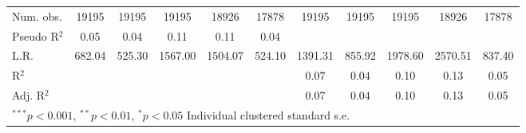 \begin{table}
\begin{center}
\begin{tabular}{l c c c c c c c c c c }
\hline
Num. obs.          & 19195         & 19195        & 19195         & 18926         & 17878        & 19195         & 19195        & 19195         & 18926         & 17878        \\
Pseudo R$^2$       & 0.05          & 0.04         & 0.11          & 0.11          & 0.04         &               &              &               &               &              \\
L.R.               & 682.04        & 525.30       & 1567.00       & 1504.07       & 524.10       & 1391.31       & 855.92       & 1978.60       & 2570.51       & 837.40       \\
R$^2$              &               &              &               &               &              & 0.07          & 0.04         & 0.10          & 0.13          & 0.05         \\
Adj. R$^2$         &               &              &               &               &              & 0.07          & 0.04         & 0.10          & 0.13          & 0.05         \\
\hline
\multicolumn{11}{l}{\scriptsize{$^{***}p<0.001$, $^{**}p<0.01$, $^*p<0.05$ Individual clustered standard s.e.}}
\end{tabular}
\label{table:int_models_no_controls}
\end{center}
\end{table}
